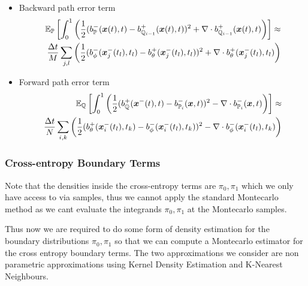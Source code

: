 \documentclass[a4paper,12pt,twoside,openright]{report}
\theoremstyle{definition}
\begin{document}
\begin{itemize}
    \item Backward path error term 
\begin{align}
    \mathbb{E}_{{\mathbb{P}}}\left[\int_0^1 \left(\frac{1}{2}(b_{\mathbb{P}}^{-}({\bm{x}}(t),t) - b_{{\mathbb{Q}}_{i-1}}^{+}({\bm{x}}(t),t))^2 + \nabla\cdot b^{+}_{{\mathbb{Q}}_{i-1}}({\bm{x}}(t),t) \right)\right] \approx \nonumber   \\
    \frac{\Delta t}{M} \sum_{j,l}\left(\frac{1}{2}(b_\phi^{-}({\bm{x}}^{-}_j(t_l), t_l) - b_{\theta}^{+}({\bm{x}}^{-}_j(t_l), t_l))^2 + \nabla\cdot b^{+}_{\theta}({\bm{x}}^{-}_j(t_l), t_l)\right)
\end{align}
    \item Forward path error term
\begin{align}
    \mathbb{E}_{{\mathbb{Q}}}\left[\int_0^1 \left(\frac{1}{2}(b_{\mathbb{Q}}^{+}({\bm{x}}^{-}(t), t) - b_{{\mathbb{P}}_{i}}^{-}({\bm{x}}, t))^2 - \nabla\cdot b^{-}_{{\mathbb{P}}_{i}}({\bm{x}}, t) \right)\right]  \approx \nonumber   \\
    \frac{\Delta t}{N} \sum_{i,k}\left(\frac{1}{2}(b_\theta^{+}({\bm{x}}^{-}_i(t_l), t_k) - b_{\phi}^{-}({\bm{x}}^{-}_i(t_l), t_k))^2 - \nabla\cdot b^{-}_{\phi}({\bm{x}}^{-}_i(t_l), t_k)\right)
\end{align}
\end{itemize}
\subsubsection{Cross-entropy Boundary Terms}

Note that the densities inside the cross-entropy terms are $\pi_0, \pi_1$ which we only have access to via samples, thus we cannot apply the standard Montecarlo method as we cant evaluate the integrands $\pi_0, \pi_1$ at the Montecarlo samples.

Thus now we are required to do some form of density estimation for the boundary distributions $\pi_0, \pi_1$ so that we can compute a Montecarlo estimator for the cross entropy boundary terms. The two approximations we consider are non parametric approximations using Kernel Density Estimation and K-Nearest Neighbours.
\end{document}
